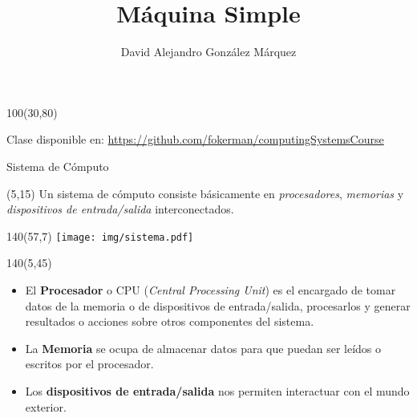 \documentclass[aspectratio=169]{beamer}
\title{\Huge Máquina Simple}
\author{David Alejandro González Márquez}
\date{}
\begin{document}
\begin{frame}[plain]
    \titlepage
    \begin{textblock}{100}(30,80)
    \begin{tcolorbox}[size=small,width=\textwidth,colback={gray!30},title={}]
    \begin{center}
     \scriptsize Clase disponible en: \url{https://github.com/fokerman/computingSystemsCourse}
    \end{center}
    \end{tcolorbox}
    \end{textblock}
\end{frame}

\begin{frame}[fragile]{Sistema de Cómputo}
    \begin{textblock}{50}(5,15)
    Un sistema de cómputo consiste básicamente en \emph{procesadores}, \emph{memorias} y \emph{dispositivos de entrada/salida} interconectados.
    \end{textblock}
    \begin{textblock}{140}(57,7)
    \texttt{[image: img/sistema.pdf]}
    \end{textblock}
    \begin{textblock}{140}(5,45)
    \begin{itemize}
    \item<2-> El \textbf{Procesador} o CPU (\emph{Central Processing Unit}) es el encargado de tomar datos de la memoria o de dispositivos de entrada/salida, procesarlos y generar resultados o acciones sobre otros componentes del sistema.
    \item<3-> La \textbf{Memoria} se ocupa de almacenar datos para que puedan ser leídos o escritos por el procesador.
    \item<4-> Los \textbf{dispositivos de entrada/salida} nos permiten interactuar con el mundo exterior.
    \end{itemize}
    \end{textblock}
\end{frame}
\end{document}

